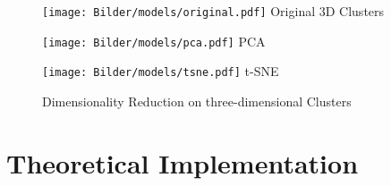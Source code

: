 \begin{figure} 
	\begin{minipage}{0.3\textwidth}
		
		\texttt{[image: Bilder/models/original.pdf]}
		\captionsetup{labelformat=empty}
		\centering
		Original 3D Clusters
		\label{fig:original}
	\end{minipage}
	\hfill
	\begin{minipage}{0.3\textwidth}
		
		\texttt{[image: Bilder/models/pca.pdf]}
		\label{fig:pca}
		\captionsetup{labelformat=empty}
		\centering
		\ac{PCA}
	\end{minipage}
	\hfill
	\begin{minipage}{0.3\textwidth}
		
		\texttt{[image: Bilder/models/tsne.pdf]}
		\label{fig:tsne}
		\captionsetup{labelformat=empty}
		\centering
		\ac{t-SNE}
	\end{minipage}
\caption{Dimensionality Reduction on three-dimensional Clusters}
\end{figure} 

\section{Theoretical Implementation}

